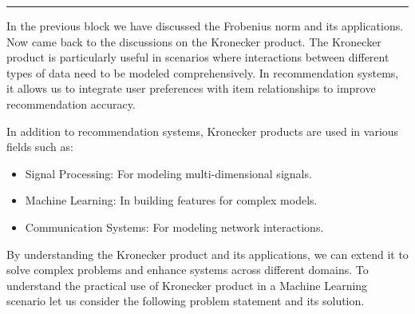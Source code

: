 \documentclass[
  letterpaper,
  DIV=11,
  numbers=noendperiod]{scrreprt}
\providecommand{\tightlist}{%
  \setlength{\itemsep}{0pt}\setlength{\parskip}{0pt}}\usepackage{longtable,booktabs,array}
\theoremstyle{plain}
\theoremstyle{definition}
\theoremstyle{remark}
\begin{document}
\begin{center}\rule{0.5\linewidth}{0.5pt}\end{center}

In the previous block we have discussed the Frobenius norm and its
applications. Now came back to the discussions on the Kronecker product.
The Kronecker product is particularly useful in scenarios where
interactions between different types of data need to be modeled
comprehensively. In recommendation systems, it allows us to integrate
user preferences with item relationships to improve recommendation
accuracy.

In addition to recommendation systems, Kronecker products are used in
various fields such as:

\begin{itemize}
\tightlist
\item
  Signal Processing: For modeling multi-dimensional signals.
\item
  Machine Learning: In building features for complex models.
\item
  Communication Systems: For modeling network interactions.
\end{itemize}

By understanding the Kronecker product and its applications, we can
extend it to solve complex problems and enhance systems across different
domains. To understand the practical use of Kronecker product in a
Machine Learning scenario let us consider the following problem
statement and its solution.
\end{document}
